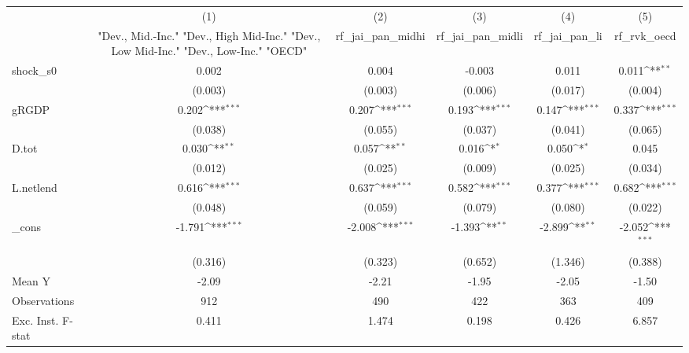 {
\def\sym#1{\ifmmode^{#1}\else\(^{#1}\)\fi}
\begin{tabular}{l*{5}{c}}
\toprule
            &\multicolumn{1}{c}{(1)}&\multicolumn{1}{c}{(2)}&\multicolumn{1}{c}{(3)}&\multicolumn{1}{c}{(4)}&\multicolumn{1}{c}{(5)}\\
            &\multicolumn{1}{c}{ "Dev., Mid.-Inc." "Dev., High Mid-Inc." "Dev., Low Mid-Inc." "Dev., Low-Inc." "OECD" }&\multicolumn{1}{c}{rf\_jai\_pan\_midhi}&\multicolumn{1}{c}{rf\_jai\_pan\_midli}&\multicolumn{1}{c}{rf\_jai\_pan\_li}&\multicolumn{1}{c}{rf\_rvk\_oecd}\\
\midrule
shock\_s0    &       0.002         &       0.004         &      -0.003         &       0.011         &       0.011\sym{**} \\
            &     (0.003)         &     (0.003)         &     (0.006)         &     (0.017)         &     (0.004)         \\
\addlinespace
gRGDP       &       0.202\sym{***}&       0.207\sym{***}&       0.193\sym{***}&       0.147\sym{***}&       0.337\sym{***}\\
            &     (0.038)         &     (0.055)         &     (0.037)         &     (0.041)         &     (0.065)         \\
\addlinespace
D.tot       &       0.030\sym{**} &       0.057\sym{**} &       0.016\sym{*}  &       0.050\sym{*}  &       0.045         \\
            &     (0.012)         &     (0.025)         &     (0.009)         &     (0.025)         &     (0.034)         \\
\addlinespace
L.netlend   &       0.616\sym{***}&       0.637\sym{***}&       0.582\sym{***}&       0.377\sym{***}&       0.682\sym{***}\\
            &     (0.048)         &     (0.059)         &     (0.079)         &     (0.080)         &     (0.022)         \\
\addlinespace
\_cons      &      -1.791\sym{***}&      -2.008\sym{***}&      -1.393\sym{**} &      -2.899\sym{**} &      -2.052\sym{***}\\
            &     (0.316)         &     (0.323)         &     (0.652)         &     (1.346)         &     (0.388)         \\
\midrule
Mean Y      &       -2.09         &       -2.21         &       -1.95         &       -2.05         &       -1.50         \\
Observations&         912         &         490         &         422         &         363         &         409         \\
Exc. Inst. F-stat&       0.411         &       1.474         &       0.198         &       0.426         &       6.857         \\
\bottomrule
\end{tabular}
}
